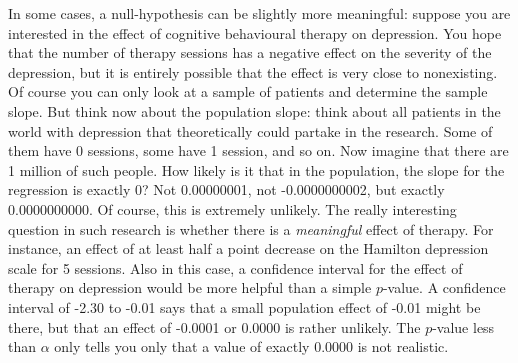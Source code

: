 \documentclass[]{book}\usepackage[]{graphicx}\usepackage[]{color}
\begin{document}
In some cases, a null-hypothesis can be slightly more meaningful: suppose you are interested in the effect of cognitive behavioural therapy on depression. You hope that the number of therapy sessions has a negative effect on the severity of the depression, but it is entirely possible that the effect is very close to nonexisting. Of course you can only look at a sample of patients and determine the sample slope. But think now about the population slope: think about all patients in the world with depression that theoretically could partake in the research. Some of them have 0 sessions, some have 1 session, and so on. Now imagine that there are 1 million of such people. How likely is it that in the population, the slope for the regression is exactly 0? Not 0.00000001, not -0.0000000002, but exactly 0.0000000000. Of course, this is extremely unlikely. The really interesting question in such research is whether there is a \textit{meaningful} effect of therapy. For instance, an effect of at least half a point decrease on the Hamilton depression scale for 5 sessions. Also in this case, a confidence interval for the effect of therapy on depression would be more helpful than a simple $p$-value. A confidence interval of -2.30 to -0.01 says that a small population effect of -0.01 might be there, but that an effect of -0.0001 or 0.0000 is rather unlikely. The $p$-value less than $\alpha$ only tells you only that a value of exactly 0.0000 is not realistic.
\end{document}
